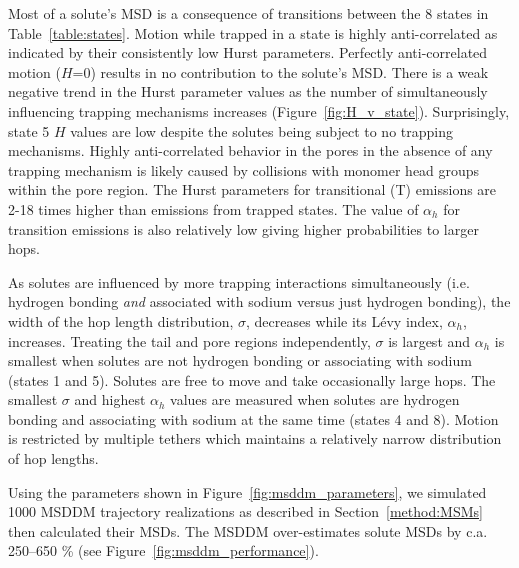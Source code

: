 \documentclass{article}
\begin{document}
  Most of a solute's MSD is a consequence of transitions between the 8 states
  in Table~\ref{table:states}. Motion while trapped in a state is highly 
  anti-correlated as indicated by their consistently low Hurst parameters.
  Perfectly anti-correlated motion ($H$=0) results in no contribution to the solute's
  MSD. There is a weak negative trend in the Hurst parameter values as the number
  of simultaneously influencing trapping mechanisms increases (Figure~\ref{fig:H_v_state}). 
  Surprisingly, state 5 $H$ values are low despite the solutes being subject to no
  trapping mechanisms. Highly anti-correlated behavior in the pores in the absence of
  any trapping mechanism is likely caused by collisions with monomer head groups 
  within the pore region. The Hurst parameters for transitional (T) emissions are 2-18 times higher 
  than emissions from trapped states. The value of $\alpha_h$ for transition 
  emissions is also relatively low giving higher probabilities to larger hops.
  
  As solutes are influenced by more trapping interactions simultaneously (i.e. hydrogen
  bonding \textit{and} associated with sodium versus just hydrogen bonding), the 
  width of the hop length distribution, $\sigma$, decreases while its L\'evy index,
  $\alpha_h$, increases. Treating the tail and pore regions independently, $\sigma$
  is largest and $\alpha_h$ is smallest when solutes are not hydrogen bonding or 
  associating with sodium (states 1 and 5). Solutes are free to move and take 
  occasionally large hops. The smallest $\sigma$ and highest $\alpha_h$ values are
  measured when solutes are hydrogen bonding and associating with sodium at the
  same time (states 4 and 8). Motion is restricted by multiple tethers which 
  maintains a relatively narrow distribution of hop lengths.
  
  
  Using the parameters shown in Figure~\ref{fig:msddm_parameters}, we simulated 
  1000 MSDDM trajectory realizations as described in Section~\ref{method:MSMs}
  then calculated their MSDs. The MSDDM over-estimates solute MSDs by c.a. 250--650 \%
  (see Figure~\ref{fig:msddm_performance}).   
  
\end{document}

